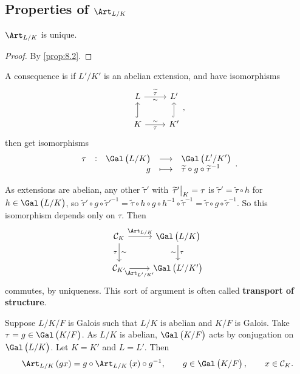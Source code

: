\subsection{Properties of \texorpdfstring{$ \Art_{L / K} $}{the Artin map}}


\begin{corollary}[Uniqueness]
$ \Art_{L / K} $ is unique.
\end{corollary}

\begin{proof}
By \ref{prop:8.2}.
\end{proof}

A consequence is if $ L' / K' $ is an abelian extension, and have isomorphisms
$$
\begin{tikzcd}
L \arrow{r}{\widetilde{\tau}}[swap]{\sim} & L' \\
K \arrow[hookrightarrow]{u} \arrow{r}{\sim}[swap]{\tau} & K' \arrow[hookrightarrow]{u}
\end{tikzcd},
$$
then get isomorphisms
$$ \function[\tau]{\Gal\br{L / K}}{\Gal\br{L' / K'}}{g}{\widetilde{\tau} \circ g \circ \widetilde{\tau}^{-1}}. $$

\pagebreak

As extensions are abelian, any other $ \widetilde{\tau}' $ with $ \left. \widetilde{\tau}' \right|_K = \tau $ is $ \widetilde{\tau}' = \widetilde{\tau} \circ h $ for $ h \in \Gal\br{L / K} $, so $ \widetilde{\tau}' \circ g \circ \widetilde{\tau}'^{-1} = \widetilde{\tau} \circ h \circ g \circ h^{-1} \circ \widetilde{\tau}^{-1} = \widetilde{\tau} \circ g \circ \widetilde{\tau}^{-1} $. So this isomorphism depends only on $ \tau $. Then
$$
\begin{tikzcd}
\CCC_K \arrow{r}{\Art_{L / K}} \arrow{d}{\sim}[swap]{\tau} & \Gal\br{L / K} \arrow{d}{\tau}[swap]{\sim} \\
\CCC_{K'} \arrow{r}[swap]{\Art_{L' / K'}} & \Gal\br{L' / K'}
\end{tikzcd}
$$
commutes, by uniqueness. This sort of argument is often called \textbf{transport of structure}.

\begin{example*}
Suppose $ L / K / F $ is Galois such that $ L / K $ is abelian and $ K / F $ is Galois. Take $ \tau = g \in \Gal\br{K / F} $. As $ L / K $ is abelian, $ \Gal\br{K / F} $ acts by conjugation on $ \Gal\br{L / K} $. Let $ K = K' $ and $ L = L' $. Then
\begin{equation}
\label{eq:5}
\Art_{L / K}\br{gx} = g \circ \Art_{L / K}\br{x} \circ g^{-1}, \qquad g \in \Gal\br{K / F}, \qquad x \in \CCC_K.
\end{equation}
\end{example*}

